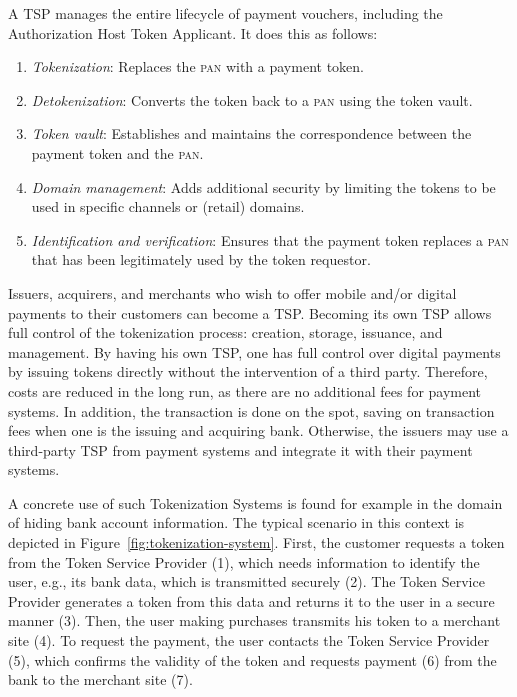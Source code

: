 \documentclass{llncs}
\begin{document}
A TSP manages the entire lifecycle of payment vouchers, including the Authorization Host Token Applicant. It does this as follows:
\begin{enumerate}
    \item \textit{Tokenization}: Replaces the \textsc{pan} with a payment token.
    \item \textit{Detokenization}: Converts the token back to a \textsc{pan} using the token vault.
    \item \textit{Token vault}: Establishes and maintains the correspondence between the payment token and the \textsc{pan}.
    \item \textit{Domain management}: Adds additional security by limiting the tokens to be used in specific channels or (retail) domains.
    \item \textit{Identification and verification}: Ensures that the payment token replaces a \textsc{pan} that has been legitimately used by the token requestor.
\end{enumerate}

Issuers, acquirers, and merchants who wish to offer mobile and/or digital payments to their customers can become a TSP. Becoming its own TSP allows full control of the tokenization process: creation, storage, issuance, and management. By having his own TSP, one has full control over digital payments by issuing tokens directly without the intervention of a third party. Therefore, costs are reduced in the long run, as there are no additional fees for payment systems. In addition, the transaction is done on the spot, saving on transaction fees when one is the issuing and acquiring bank. Otherwise, the issuers may use a third-party TSP from payment systems and integrate it with their payment systems.

A concrete use of such Tokenization Systems is found for example in the domain of hiding bank account information. The typical scenario in this context is depicted in Figure~\ref{fig:tokenization-system}. First, the customer requests a token from the Token Service Provider (1), which needs information to identify the user, e.g., its bank data, which is transmitted securely (2). The Token Service Provider generates a token from this data and returns it to the user in a secure manner (3). Then, the user making purchases transmits his token to a merchant site (4). To request the payment, the user contacts the Token Service Provider (5), which confirms the validity of the token and requests payment (6) from the bank to the merchant site (7).
\end{document}
